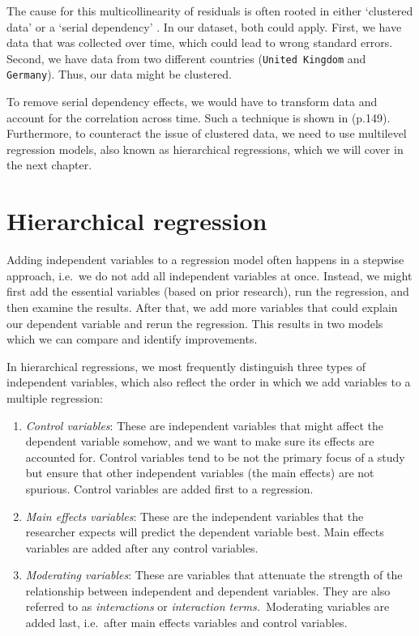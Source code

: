 \documentclass[
]{book}
\begin{document}
The cause for this multicollinearity of residuals is often rooted in either `clustered data' or a `serial dependency' \citep{cohen2014applied}. In our dataset, both could apply. First, we have data that was collected over time, which could lead to wrong standard errors. Second, we have data from two different countries (\texttt{United\ Kingdom} and \texttt{Germany}). Thus, our data might be clustered.

To remove serial dependency effects, we would have to transform data and account for the correlation across time. Such a technique is shown in \citet{cohen2014applied} (p.149). Furthermore, to counteract the issue of clustered data, we need to use multilevel regression models, also known as hierarchical regressions, which we will cover in the next chapter.

\hypertarget{hierarchical-regression}{%
\section{Hierarchical regression}\label{hierarchical-regression}}

Adding independent variables to a regression model often happens in a stepwise approach, i.e.~we do not add all independent variables at once. Instead, we might first add the essential variables (based on prior research), run the regression, and then examine the results. After that, we add more variables that could explain our dependent variable and rerun the regression. This results in two models which we can compare and identify improvements.

In hierarchical regressions, we most frequently distinguish three types of independent variables, which also reflect the order in which we add variables to a multiple regression:

\begin{enumerate}
\def\labelenumi{\arabic{enumi}.}
\item
  \emph{Control variables}: These are independent variables that might affect the dependent variable somehow, and we want to make sure its effects are accounted for. Control variables tend to be not the primary focus of a study but ensure that other independent variables (the main effects) are not spurious. Control variables are added first to a regression.
\item
  \emph{Main effects variables}: These are the independent variables that the researcher expects will predict the dependent variable best. Main effects variables are added after any control variables.
\item
  \emph{Moderating variables}: These are variables that attenuate the strength of the relationship between independent and dependent variables. They are also referred to as \emph{interactions} or \emph{interaction terms.}~Moderating variables are added last, i.e.~after main effects variables and control variables.
\end{enumerate}
\end{document}
